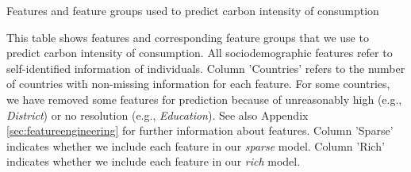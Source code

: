\begin{table}[ht!]
\begin{adjustbox}{width=1\textwidth}
\end{adjustbox}
  \caption{Features and feature groups used to predict carbon intensity of consumption}
  \label{tab:features}

\begin{subcaption2}
This table shows features and corresponding feature groups that we use to predict carbon intensity of consumption. All sociodemographic features refer to self-identified information of individuals. Column 'Countries' refers to the number of countries with non-missing information for each feature. For some countries, we have removed some features for prediction because of unreasonably high (e.g., \textit{District}) or no resolution (e.g., \textit{Education}). See also Appendix \ref{sec:featureengineering} for further information about features. Column 'Sparse' indicates whether we include each feature in our \textit{sparse} model. Column 'Rich' indicates whether we include each feature in our \textit{rich} model.
\end{subcaption2}
\end{table}